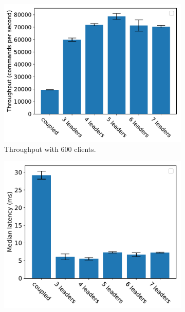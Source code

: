 \begin{figure}[ht]
  \centering
  \begin{subfigure}[b]{0.3\textwidth}
    \centering
    \includegraphics[width=\textwidth]{assets/nsdi_fig2_ablation_high_load_throughput.pdf}
    \caption{Throughput with 600 clients.}%
  \end{subfigure}\hspace{0.03\textwidth}
  \begin{subfigure}[b]{0.3\textwidth}
    \centering
    \includegraphics[width=\textwidth]{assets/nsdi_fig2_ablation_high_load_latency.pdf}

\end{subfigure}
\end{figure}
